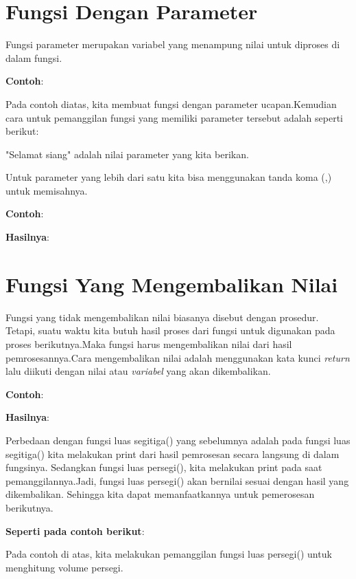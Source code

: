 \section{Fungsi Dengan Parameter}
\par Fungsi parameter merupakan variabel yang menampung nilai untuk diproses di dalam fungsi.
\par \textbf{Contoh}:

Pada contoh diatas, kita membuat fungsi dengan parameter ucapan.Kemudian cara untuk pemanggilan fungsi yang memiliki parameter tersebut adalah seperti berikut:

"Selamat siang" adalah nilai parameter yang kita berikan.
\par Untuk parameter yang lebih dari satu kita bisa menggunakan tanda koma (,) untuk memisahnya.
\par\textbf{Contoh}:



\par\textbf{Hasilnya}:

\section{Fungsi Yang Mengembalikan Nilai}
Fungsi yang tidak mengembalikan nilai biasanya disebut dengan prosedur.
Tetapi, suatu waktu kita butuh hasil proses dari fungsi untuk digunakan pada proses berikutnya.Maka fungsi harus mengembalikan nilai dari hasil pemrosesannya.Cara mengembalikan nilai adalah menggunakan kata kunci \textit{return} lalu diikuti dengan nilai atau \textit{variabel} yang akan dikembalikan.
\par\textbf{Contoh}:

\par \textbf{Hasilnya}:

Perbedaan dengan fungsi luas segitiga() yang sebelumnya adalah pada fungsi luas segitiga() kita melakukan print dari hasil pemrosesan secara langsung di dalam fungsinya. Sedangkan fungsi luas persegi(), kita melakukan print pada saat pemanggilannya.Jadi, fungsi luas persegi() akan bernilai sesuai dengan hasil yang dikembalikan.
Sehingga kita dapat memanfaatkannya untuk pemerosesan berikutnya.
\par\textbf{Seperti pada contoh berikut}:

\par Pada contoh di atas, kita melakukan pemanggilan fungsi luas persegi() untuk menghitung volume persegi.
